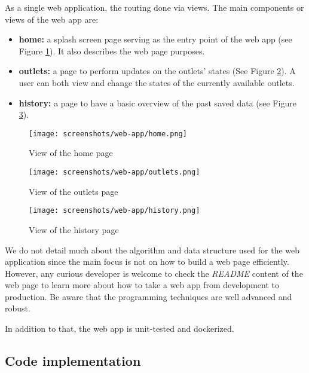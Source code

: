 As a single web application, the routing done via views. The main components or views of the web app are:
\begin{itemize}
    \item \textbf{home:} a splash screen page serving as the entry point of the web app (see Figure \ref{fig:ui-home}). It also describes the web page purposes.
    \item \textbf{outlets:} a page to perform updates on the outlets' states (See Figure \ref{fig:ui-outlets}). A user can both view and change the states of the currently available outlets.
    \item \textbf{history:} a page to have a basic overview of the past saved data (see Figure \ref{fig:ui-history}).
\end{itemize}

\begin{figure}[ht!]
    \centering
    \texttt{[image: screenshots/web-app/home.png]}
    \caption{View of the home page}
    \label{fig:ui-home}
\end{figure}

\begin{figure}[ht!]
    \centering
    \texttt{[image: screenshots/web-app/outlets.png]}
    \caption{View of the outlets page}
    \label{fig:ui-outlets}
\end{figure}

\begin{figure}[ht!]
    \centering
    \texttt{[image: screenshots/web-app/history.png]}
    \caption{View of the history page}
    \label{fig:ui-history}
\end{figure}

We do not detail much about the algorithm and data structure used for the web application since the main focus is not on how to build a web page efficiently. However, any curious developer is welcome to check the \textit{README} content of the web page to learn more about how to take a web app from development to production. Be aware that the programming techniques are well advanced and robust.

In addition to that, the web app is unit-tested and dockerized.

\subsection{Code implementation}
